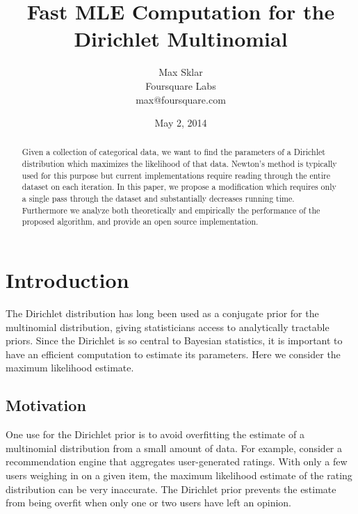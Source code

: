 \documentclass[twoside]{article}
\begin{document}
\parindent=0in
\parskip=12pt

%
%
%
%

\title{Fast MLE Computation for the Dirichlet Multinomial}

\author{Max Sklar\\
Foursquare Labs\\
max@foursquare.com
}

\date{May 2, 2014}

\maketitle
\thispagestyle{empty}

\begin{abstract}
Given a collection of categorical data, we want to find the parameters of a Dirichlet distribution which maximizes the likelihood of that data.  Newton's method is typically used for this purpose but current implementations require reading through the entire dataset on each iteration.  In this paper, we propose a modification which requires only a single pass through the dataset and substantially decreases running time.  Furthermore we analyze both theoretically and empirically the performance of the proposed algorithm, and provide an open source implementation.
\end{abstract}

\section{Introduction}

The Dirichlet distribution has long been used as a conjugate prior for the multinomial distribution, giving statisticians access to analytically tractable priors. Since the Dirichlet is so central to Bayesian statistics, it is important to have an efficient computation to estimate its parameters. Here we consider the maximum likelihood estimate.

\subsection{Motivation}

One use for the Dirichlet prior is to avoid overfitting the estimate of a multinomial distribution from a small amount of data.  For example, consider a recommendation engine that aggregates user-generated ratings.  With only a few users weighing in on a given item, the maximum likelihood estimate of the rating distribution can be very inaccurate.  The Dirichlet prior prevents the estimate from being overfit when only one or two users have left an opinion.
\end{document}

